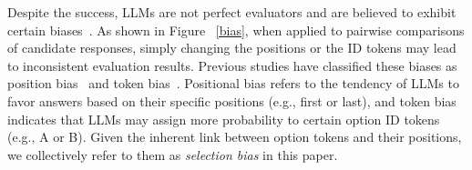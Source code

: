\documentclass[sigconf]{acmart}
\begin{document}
Despite the success, LLMs are not perfect evaluators and are believed to exhibit certain biases~\cite{zheng2023large,zheng2023judging}. As shown in Figure ~\ref{bias}, when applied to pairwise comparisons of candidate responses, simply changing the positions or the ID tokens may lead to inconsistent evaluation results.
Previous studies have classified these biases as position bias~\cite{zheng2023judging,shi2024judging} and token bias~\cite{pezeshkpour2023large,raina2024llm}.
Positional bias refers to the tendency of LLMs to favor answers based on their specific positions (e.g., first or last), and token bias indicates that LLMs may assign more probability to certain option ID tokens (e.g., A or B).  
Given the inherent link between option tokens and their positions, we collectively refer to them as \textit{selection bias} in this paper.





\end{document}
